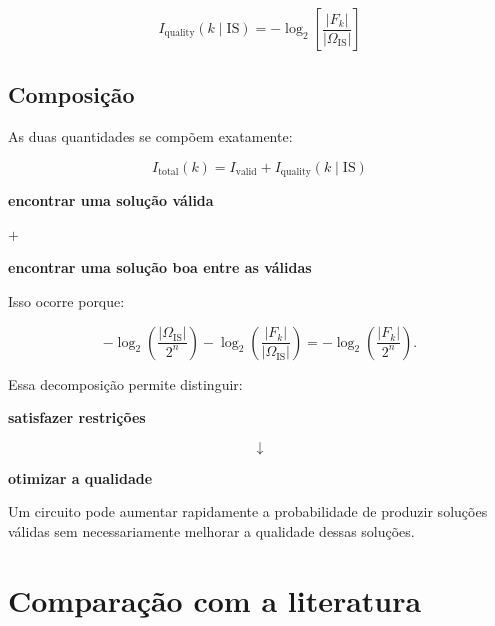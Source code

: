 \documentclass[11pt,a4paper]{article}
\begin{document}
\begin{definitionbox}

\[
\boxed{
I_{\mathrm{quality}}(k\mid\mathrm{IS})
=
-\log_2
\left[
\frac{
|F_k|
}{
|\Omega_{\mathrm{IS}}|
}
\right]
}
\]

\end{definitionbox}

\subsection{Composição}

As duas quantidades se compõem exatamente:

\begin{proposedbox}

\[
\boxed{
I_{\mathrm{total}}(k)
=
I_{\mathrm{valid}}
+
I_{\mathrm{quality}}(k\mid\mathrm{IS})
}
\]

\begin{center}

\textbf{encontrar uma solução válida}

$+$

\textbf{encontrar uma solução boa entre as válidas}

\end{center}

\end{proposedbox}

Isso ocorre porque:

\[
-\log_2
\left(
\frac{|\Omega_{\mathrm{IS}}|}{2^n}
\right)
-
\log_2
\left(
\frac{|F_k|}{|\Omega_{\mathrm{IS}}|}
\right)
=
-\log_2
\left(
\frac{|F_k|}{2^n}
\right).
\]

Essa decomposição permite distinguir:

\begin{center}

\textbf{satisfazer restrições}

\[
\downarrow
\]

\textbf{otimizar a qualidade}

\end{center}

Um circuito pode aumentar rapidamente a probabilidade de produzir
soluções válidas sem necessariamente melhorar a qualidade dessas soluções.

\section{Comparação com a literatura}
\end{document}
